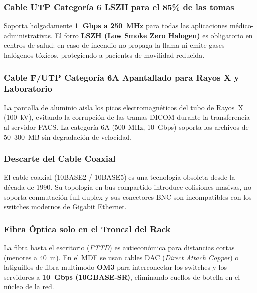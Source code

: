 \subsubsection{Cable UTP Categoría 6 LSZH para el 85\% de las tomas}

Soporta holgadamente \textbf{1~Gbps a 250~MHz} para todas las aplicaciones médico-administrativas. El forro \textbf{LSZH (Low Smoke Zero Halogen)} es obligatorio en centros de salud: en caso de incendio no propaga la llama ni emite gases halógenos tóxicos, protegiendo a pacientes de movilidad reducida.

\subsubsection{Cable F/UTP Categoría 6A Apantallado para Rayos X y Laboratorio}

La pantalla de aluminio aisla los picos electromagnéticos del tubo de Rayos~X (100~kV), evitando la corrupción de las tramas DICOM durante la transferencia al servidor PACS. La categoría 6A (500~MHz, 10~Gbps) soporta los archivos de 50--300~MB sin degradación de velocidad.

\subsubsection{Descarte del Cable Coaxial}

El cable coaxial (10BASE2 / 10BASE5) es una tecnología obsoleta desde la década de 1990. Su topología en bus compartido introduce colisiones masivas, no soporta conmutación full-duplex y sus conectores BNC son incompatibles con los switches modernos de Gigabit Ethernet.

\subsubsection{Fibra Óptica solo en el Troncal del Rack}

La fibra hasta el escritorio (\textit{FTTD}) es antieconómica para distancias cortas (menores a 40~m). En el MDF se usan cables DAC (\textit{Direct Attach Copper}) o latiguillos de fibra multimodo \textbf{OM3} para interconectar los switches y los servidores a \textbf{10~Gbps (10GBASE-SR)}, eliminando cuellos de botella en el núcleo de la red.
